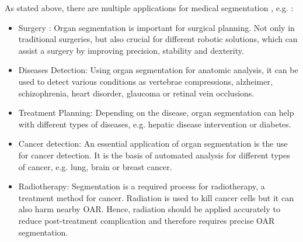 As stated above, there are multiple applications for medical segmentation \cite{Aljabri.2022} , e.g. :
\begin{itemize}
    \item Surgery \cite{Howe.1999} \cite{Aljabri.2022}: Organ segmentation is important for surgical planning. Not only in traditional surgeries, but also crucial for different robotic solutions, which can assist a surgery by improving precision, stability and dexterity. 
    
    \item Diseases Detection:  Using organ segmentation for anatomic analysis, it can be used to detect various conditions as vertebrae compressions, alzheimer, schizophrenia, heart disorder, glaucoma or retinal vein occlusions.
    
    \item Treatment Planning: Depending on the disease, organ segmentation can help with different types of diseases, e.g.  hepatic disease intervention or diabetes.
    
    \item Cancer detection: An essential application of organ segmentation is the use for cancer detection. It is the basis of automated analysis for different types of cancer, e.g. lung, brain or breast cancer.
    
    \item Radiotherapy: Segmentation is a required process for radiotherapy, a treatment method for cancer. Radiation is used to kill cancer cells but it can also harm nearby \ac{OAR}.  Hence, radiation should be applied accurately to reduce post-treatment complication and therefore requires precise \ac{OAR} segmentation.

\end{itemize}

